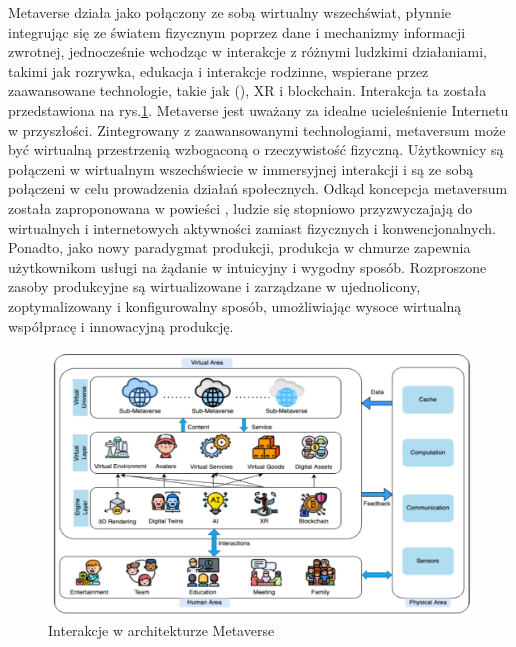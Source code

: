 Metaverse działa jako połączony ze sobą wirtualny wszechświat, płynnie integrując się ze światem fizycznym poprzez dane i mechanizmy informacji zwrotnej, jednocześnie wchodząc w interakcje z różnymi ludzkimi działaniami, takimi jak rozrywka, edukacja i interakcje rodzinne, wspierane przez zaawansowane technologie, takie jak  (), XR i blockchain. Interakcja ta została przedstawiona na rys.\ref{abstractMetaverseArchitectureHumanVirtualPhisical}. Metaverse jest uważany za idealne ucieleśnienie Internetu w przyszłości. Zintegrowany z zaawansowanymi technologiami, metaversum może być wirtualną przestrzenią wzbogaconą o rzeczywistość fizyczną. Użytkownicy są połączeni w wirtualnym wszechświecie w immersyjnej interakcji i są ze sobą połączeni w celu prowadzenia działań społecznych. Odkąd koncepcja metaversum została zaproponowana w powieści , ludzie się stopniowo przyzwyczajają do wirtualnych i internetowych aktywności zamiast fizycznych i konwencjonalnych. Ponadto, jako nowy paradygmat produkcji, produkcja w chmurze zapewnia użytkownikom usługi na żądanie w intuicyjny i wygodny sposób. Rozproszone zasoby produkcyjne są wirtualizowane i zarządzane w ujednolicony, zoptymalizowany i konfigurowalny sposób, umożliwiając wysoce wirtualną współpracę i innowacyjną produkcję\cite{industrialMetaverseForSmartManufacturing}. 

\begin{figure}[htbp!]
    \centering
    \includegraphics[width=\textwidth]{images/metaverse/metaverseAbstractArchitecture.png}
    \caption{Interakcje w architekturze Metaverse\cite{aSurveyofMobileEdgeComputingForMetaverse}}
    \label{abstractMetaverseArchitectureHumanVirtualPhisical}
\end{figure}

